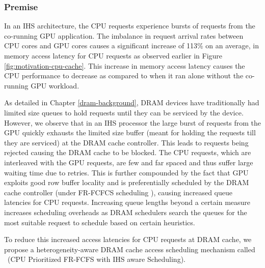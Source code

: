 \subsubsection{Premise}
In an IHS architecture, the CPU requests experience bursts of requests from the co-running GPU application. The imbalance in request arrival rates between CPU cores and GPU cores causes a significant increase of 113\% on an average, in memory access latency for CPU requests as observed earlier in Figure \ref{fig:motivation-cpu-cache}. This increase in memory access latency causes the CPU performance to decrease as compared to when it ran alone without the co-running GPU workload.
\par As detailed in Chapter \ref{dram-background}, DRAM devices have traditionally had limited size queues to hold requests until they can be serviced by the device. However, we observe that in an IHS processor the large burst of requests from the GPU quickly exhausts the limited size buffer (meant for holding the requests till they are serviced) at the DRAM cache controller. This leads to requests being rejected causing the DRAM cache to be blocked. 
The CPU requests, which are interleaved with the GPU requests, are few and far spaced and thus suffer large waiting time due to retries. This is further compounded by the fact that GPU exploits good row buffer locality and is preferentially scheduled by the DRAM cache controller (under FR-FCFCS scheduling \cite{sms}), causing increased queue latencies for CPU requests. Increasing queue lengths beyond a certain measure increases scheduling overheads as DRAM schedulers search the queues for the most suitable request to schedule based on certain heuristics.
\par To reduce this increased access latencies for CPU requests at DRAM cache, we propose a heterogeneity-aware DRAM cache access scheduling mechanism called \prioname\ (CPU Prioritized FR-FCFS with IHS aware Scheduling).

